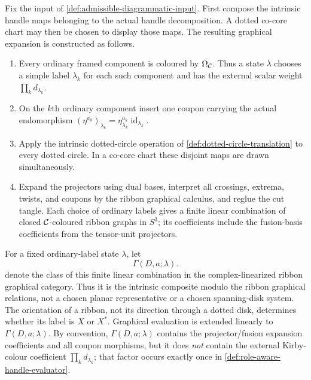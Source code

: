 \begin{definition}
\label{def:role-aware-graphical-expansion}
Fix the input of \cref{def:admissible-diagrammatic-input}.  First compose the
intrinsic handle maps belonging to the actual handle decomposition.  A dotted
co-core chart may then be chosen to display those maps.  The resulting
graphical expansion is constructed as follows.
\begin{enumerate}[label=(\roman*),ref=\roman*]
  \item\label{item:ordinary-kirby-expansion}
  Every ordinary framed component is coloured by $\Omega_{\mathcal{C}}$.  Thus a
  state $\lambda$ chooses a simple label $\lambda_k$ for each such component
  and has the external scalar weight $\prod_k d_{\lambda_k}$.

  \item\label{item:character-coupons}
  On the $k$th ordinary component insert one coupon carrying
  the actual endomorphism
  $(\eta^{a_k})_{\lambda_k}
   =\eta_{\lambda_k}^{a_k}\operatorname{id}_{\lambda_k}$.

  \item\label{item:dotted-cut-projector}
  Apply the intrinsic dotted-circle operation of
  \cref{def:dotted-circle-translation} to every dotted circle.  In a co-core
  chart these disjoint maps are drawn simultaneously.

  \item\label{item:graphical-regluing}
  Expand the projectors using dual bases, interpret all crossings, extrema,
  twists, and coupons by the ribbon graphical calculus, and reglue the cut
  tangle.  Each choice of ordinary labels gives a finite linear combination
  of closed $\mathcal{C}$-coloured ribbon graphs in $S^3$; its coefficients include
  the fusion-basis coefficients from the tensor-unit projectors.
\end{enumerate}
For a fixed ordinary-label state $\lambda$, let
\[
  \Gamma(D,a;\lambda).
\]
denote the class of this finite linear combination in the complex-linearized
ribbon graphical category.  Thus it is the intrinsic composite modulo the
ribbon graphical relations, not a chosen planar representative or a chosen
spanning-disk system.
The orientation of a ribbon, not its direction through a dotted disk,
determines whether its label is $X$ or $X^*$.  Graphical evaluation is
extended linearly to $\Gamma(D,a;\lambda)$.  By convention,
$\Gamma(D,a;\lambda)$ contains the projector/fusion expansion coefficients
and all coupon morphisms, but it does \emph{not} contain the external
Kirby-colour coefficient $\prod_kd_{\lambda_k}$; that factor occurs exactly
once in \cref{def:role-aware-handle-evaluator}.
\end{definition}

